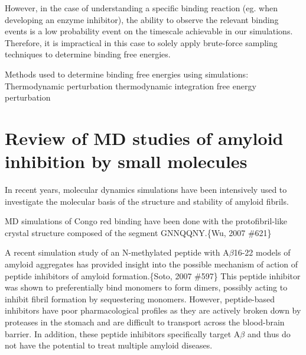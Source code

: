\begin{outline}
	\1 However, in the case of understanding a specific binding reaction (eg. when developing an enzyme inhibitor), the ability to observe the relevant binding events is a low probability event on the timescale achievable in our simulations. Therefore, it is  impractical in this case to solely apply brute-force sampling techniques to determine binding free energies.

	  \2 Methods used to determine binding free energies using simulations:
	  	\3 Thermodynamic perturbation \cite{Gilson:2007hz}
			\4 thermodynamic integration
			\4 free energy perturbation
\end{outline}

\section{Review of MD studies of amyloid inhibition by small molecules}

\begin{outline}
	\1 In recent years, molecular dynamics simulations have been intensively used to investigate the molecular basis of the structure and stability of amyloid fibrils. 
	
	\1 MD simulations of Congo red binding have been done with the protofibril-like crystal structure composed of the segment GNNQQNY.\{Wu, 2007 \#621\}
	
	\1 A recent simulation study of an N-methylated peptide with A$\beta$16-22 models of amyloid aggregates has provided insight into the possible mechanism of action of peptide inhibitors of amyloid formation.\{Soto, 2007 \#597\} This peptide inhibitor was shown to preferentially bind monomers to form dimers, possibly acting to inhibit fibril formation by sequestering monomers. However, peptide-based inhibitors have poor pharmacological profiles as they are actively broken down by proteases in the stomach and are difficult to transport across the blood-brain barrier. In addition, these peptide inhibitors specifically target A$\beta$ and thus do not have the potential to treat multiple amyloid diseases.
\end{outline}




